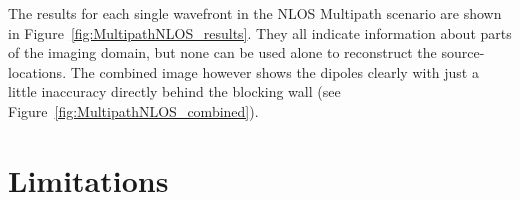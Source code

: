 The results for each single wavefront in the NLOS Multipath scenario are shown in Figure~\ref{fig:MultipathNLOS_results}.
They all indicate information about parts of the imaging domain, but none can be used alone to reconstruct the source-locations.
The combined image however shows the dipoles clearly with just a little inaccuracy directly behind the blocking wall (see Figure~\ref{fig:MultipathNLOS_combined}).


\section{Limitations}